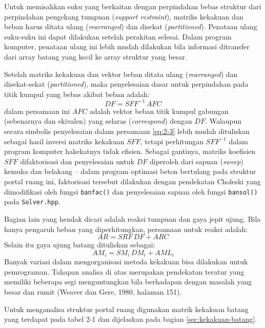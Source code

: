 Untuk memisahkan suku yang berkaitan dengan perpindahan bebas struktur dari
perpindahan pengekang tumpuan (\textit{support restraint}), matriks
kekakuan dan beban harus ditata ulang (\textit{rearranged}) dan disekat
(\textit{partitioned}). Penataan ulang suku-suku ini dapat dilakukan
setelah perakitan selesai. Dalam program komputer, penataan ulang ini lebih
mudah dilakukan bila informasi ditransfer dari array batang yang kecil ke
array struktur yang besar.

Setelah matriks kekakuan dan vektor beban ditata ulang (\textit{rearranged})
dan disekat-sekat (\textit{partitioned}), maka penyelesaian dasar untuk
perpindahan pada titik kumpul yang bebas akibat beban adalah:
\begin{equation}
DF = SFF^{-1} \, AFC
\label{eq:2-3}
\end{equation}
dalam persamaan ini $AFC$ adalah vektor beban titik kumpul gabungan
(sebenarnya dan ekivalen) yang selaras (\textit{correspond}) dengan $DF$.
Walaupun secara simbolis penyelesaian dalam persamaan \eqref{eq:2-3} lebih
mudah dituliskan sebagai hasil inversi matriks kekakuan $SFF$, tetapi
perhitungan $SFF^{-1}$ dalam program komputer hakekatnya tidak efisien.
Sebagai gantinya, matriks koefisien $SFF$ difaktorisasi dan penyelesaian
untuk $DF$ diperoleh dari sapuan (\textit{sweep}) kemuka dan belakang --
dalam program optimasi beton bertulang pada struktur portal ruang ini,
faktorisasi tersebut dilakukan dengan pendekatan Choleski yang dimodifikasi
oleh fungsi \texttt{banfac()} dan penyelesaian sapuan oleh fungsi
\texttt{bansol()} pada \texttt{Solver.hpp}.

Bagian lain yang hendak dicari adalah reaksi tumpuan dan gaya jepit ujung.
Bila hanya pengaruh beban yang diperhitungkan, persamaan untuk reaksi
adalah:
\begin{equation}
AR = SRF \, DF + ARC
\label{eq:2-4}
\end{equation}
Selain itu gaya ujung batang dituliskan sebagai:
\begin{equation}
AM_i = SM_i \, DM_i + AML_i
\label{eq:2-5}
\end{equation}
Banyak variasi dalam mengorganisasi metoda kekakuan bisa dilakukan untuk
pemrograman. Tahapan analisa di atas merupakan pendekatan teratur yang
memiliki beberapa segi menguntungkan bila berhadapan dengan masalah yang
besar dan rumit (Weaver dan Gere, 1980, halaman 151).

Untuk menganalisa struktur portal ruang digunakan matrik kekakuan batang
yang terdapat pada tabel 2-1 dan dijelaskan pada bagian \ref{sec:kekakuan-batang}.

